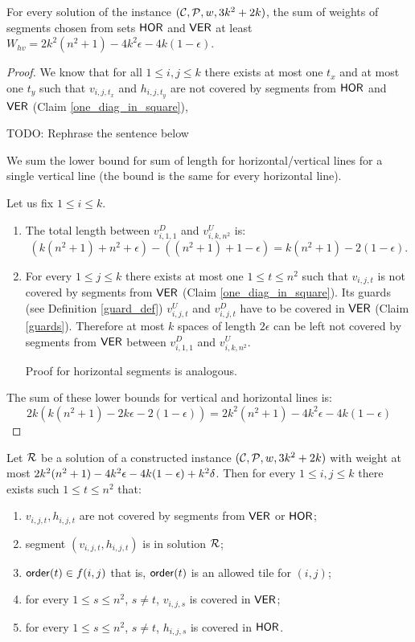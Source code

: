 \begin{lemma}
\label{vertical_horizontal_sum}
For every solution of the instance $(\mathcal{C}, \mathcal{P}, w, 3k^2+2k)$,
the sum of weights of segments chosen
from sets $\mathsf{HOR}$ and $\mathsf{VER}$ at least
$W_{hv} = 2k^2(n^2+1) -4k^2\epsilon -4k(1-\epsilon)$.
\end{lemma}

\begin{proof}
We know that for all $1 \le i,j \le k$
there exists at most one $t_x$ and at most one $t_y$ such that
$v_{i,j,t_x}$ and $h_{i,j,t_y}$
are not covered by
segments from $\mathsf{HOR}$ and $\mathsf{VER}$ (Claim \ref{one_diag_in_square}),

TODO: Rephrase the sentence below

We sum the lower bound for sum of length for horizontal/vertical
lines for a single vertical line
(the bound is the same for every horizontal line).

Let us fix $1 \le i \le k$.

\begin{enumerate}[label={(\arabic*)}]
\item The total length between $v^D_{i, 1, 1}$ and $v^U_{i, k, n^2}$ is:
$$(k(n^2+1) + n^2 +\epsilon) - ((n^2+1)+1 -\epsilon) = k(n^2+1) - 2(1 - \epsilon).$$

\item For every $1 \le j \le k$ there exists at most one $1 \le t \le n^2$
such that $v_{i,j,t}$ is not covered by segments from $\mathsf{VER}$
(Claim \ref{one_diag_in_square}).
Its guards (see Definition \ref{guard_def}) $v^U_{i,j,t}$ and $v^D_{i,j,t}$
have to be covered in $\mathsf{VER}$ (Claim \ref{guards}).
Therefore at most $k$ spaces of length $2\epsilon$ can be left
not covered by segments from $\mathsf{VER}$ between $v_{i,1,1}^D$ and $v_{i,k,n^2}^U$.

Proof for horizontal segments is analogous.

\end{enumerate}
The sum of these lower bounds for vertical and horizontal lines is:
$$2k(k(n^2+1) -2k\epsilon -2(1-\epsilon)) = 2k^2(n^2+1) -4k^2\epsilon -4k(1-\epsilon)$$
\end{proof}

\begin{lemma}
\label{diag_correct}
Let $\mathcal{R}$ be a solution 
of a constructed instance $(\mathcal{C}, \mathcal{P}, w, 3k^2+2k)$
with weight at most  $2k^2(n^2+1) - 4k^2\epsilon -4k(1-\epsilon) +k^2\delta$.
Then for every $1 \le i,j \le k$
there exists such $1 \le t \le n^2$ that:
\begin{enumerate}[label={(\arabic*)}]
\item $v_{i,j,t}, h_{i,j,t}$ are not covered by segments from $\mathsf{VER}$ or $\mathsf{HOR}$;
\item segment $(v_{i,j,t}, h_{i,j,t})$ is in solution $\mathcal{R}$;
\item $\mathsf{order}(t) \in f(i,j)$ that is, $\mathsf{order}(t)$ is an allowed tile for $(i,j)$;
\item for every $1 \le s\le n^2$, $s \neq t$, $v_{i,j,s}$ is covered in $\mathsf{VER}$;
\item for every $1 \le s\le n^2$, $s \neq t$, $h_{i,j,s}$ is covered in $\mathsf{HOR}$.
\end{enumerate}
\end{lemma}

